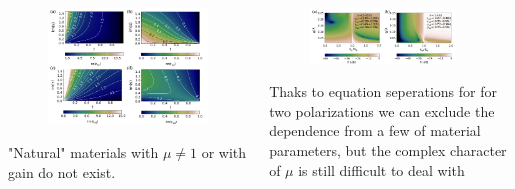 \documentclass{beamer}
\begin{document}
\begin{frame} [t]
	\begin{columns}
		\begin{column}{0.5\textwidth}
			\begin{figure}
						\includegraphics[width=\textwidth]{../images/pml/oqe_materials.png}
			\end{figure}
			"Natural" materials with  $\mu \ne 1$ or with gain  do not exist.
		\end{column}
		\begin{column}{0.6\textwidth}
			\begin{figure}
						\includegraphics[width=0.9\textwidth]{../images/pml/oqe_reflection_kat.png}\\
			\end{figure}
				
		{\tiny Thaks to equation seperations for for two polarizations we can exclude the dependence from a few of material parameters, but the complex character of $\mu$ is still difficult to deal with}	


\end{column}
\end{columns}
\end{frame}
\end{document}

